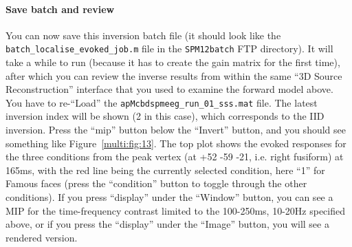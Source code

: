 \paragraph{Save batch and review}

You can now save this inversion batch file (it should look like the \texttt{batch\_localise\_evoked\_job.m} file in the \texttt{SPM12batch} FTP directory). It will take a while to run (because it has to create the gain matrix for the first time), after which you can review the inverse results from within the same ``3D Source Reconstruction'' interface that you used to examine the forward model above. You have to re-``Load'' the \texttt{apMcbdspmeeg\_run\_01\_sss.mat} file. The latest inversion index will be shown (2 in this case), which corresponds to the IID inversion. Press the ``mip'' button below the ``Invert'' button, and you should see something like Figure~\ref{multi:fig:13}. The top plot shows the evoked responses for the three conditions from the peak vertex (at +52 -59 -21, i.e. right fusiform) at 165ms, with the red line being the currently selected condition, here ``1'' for Famous faces (press the ``condition'' button to toggle through the other conditions). If you press ``display'' under the ``Window'' button, you can see a MIP for the time-frequency contrast limited to the 100-250ms, 10-20Hz specified above, or if you press the ``display'' under the ``Image'' button, you will see a rendered version.

